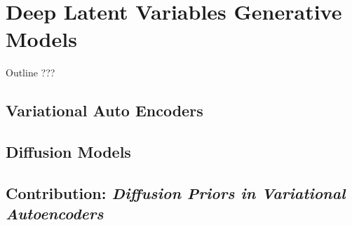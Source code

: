 \chapter{Deep Latent Variables Generative Models}\label{ch:03}

\begin{remark}{Outline}
???
\end{remark}

\section{Variational Auto Encoders}

\section{Diffusion Models}

\section{Contribution: \textit{Diffusion Priors in Variational Autoencoders}}
